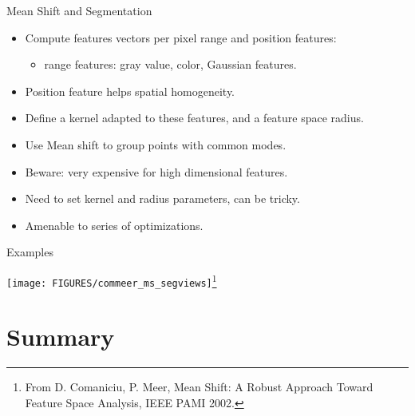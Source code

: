 \documentclass[9pt]{beamer}
\begin{document}
\begin{frame}{Mean Shift and Segmentation}
  \begin{itemize}
  \item Compute features vectors per pixel range and position features: 
    \begin{itemize}
    \item range features: gray value, color, Gaussian features.
    \end{itemize}
  \item Position feature helps spatial homogeneity.
  \item Define a kernel adapted to these features, and a feature space radius.
  \item Use Mean shift to group points with common modes.  
  \item Beware: very expensive for high dimensional features.
  \item Need to set kernel and radius parameters, can be tricky.
  \item Amenable to series of optimizations.
    
  \end{itemize}  
\end{frame}


\begin{frame}{Examples}
  \begin{center}
    \texttt{[image: FIGURES/commeer\_ms\_segviews]}\footnote{From
    D. Comaniciu, P. Meer, Mean Shift: A Robust Approach Toward
    Feature Space Analysis, IEEE PAMI 2002.}
  \end{center}
\end{frame}

\section{Summary}
\end{document}
